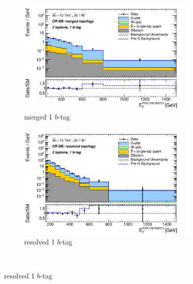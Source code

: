 \begin{figure}[htbp]
\begin{subfigure}{0.45\textwidth}
    \centering
    \includegraphics[width=0.95\textwidth]{figures/monoV/postfit/monoV_2lep_1tag_merged_massFail_met_XS.pdf}
    \caption{merged 1 \(b\)-tag}
  \end{subfigure}
    \begin{subfigure}{0.45\textwidth}
    \centering
    \includegraphics[width=0.95\textwidth]{figures/monoV/postfit/monoV_2lep_1tag_resolved_massFail_met_XS.pdf}
    \caption{resolved 1 \(b\)-tag}
  \end{subfigure} \\


\end{figure}
